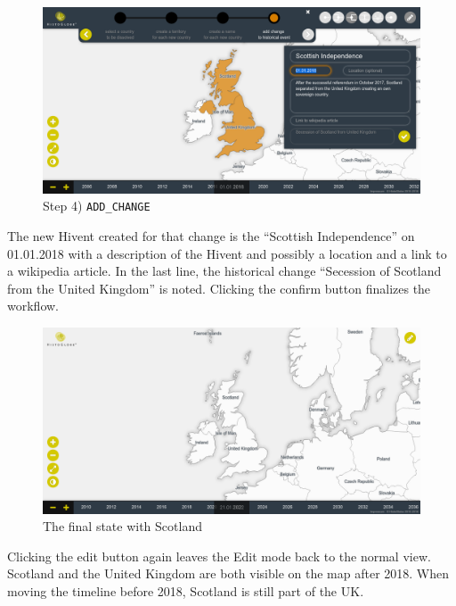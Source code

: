 
\vspace{1em}
\begin{minipage}[t]{0.47\textwidth}

  \begin{figure}[H]
    \centering
    \includegraphics[width=1.0\textwidth]{graphics/development/final_interface/7_add_change_to_hivent_2.png}
    \caption{Step 4) \texttt{ADD\_CHANGE}}
    \label{fig:final_7_add_change_to_hivent_2}
  \end{figure}

  The new Hivent created for that change is the ``Scottish Independence'' on 01.01.2018 with a description of the Hivent and possibly a location and a link to a wikipedia article. In the last line, the historical change ``Secession of Scotland from the United Kingdom'' is noted. Clicking the confirm button finalizes the workflow.

\end{minipage}    %
\hspace{1.5em}    %
\begin{minipage}[t]{0.47\textwidth}

  \begin{figure}[H]
    \centering
    \includegraphics[width=1.0\textwidth]{graphics/development/final_interface/8_final_state.png}
    \caption{The final state with Scotland}
    \label{fig:final_8_final_state}
  \end{figure}

  Clicking the edit button again leaves the Edit mode back to the normal view. Scotland and the United Kingdom are both visible on the map after 2018. When moving the timeline before 2018, Scotland is still part of the UK.

\end{minipage}




